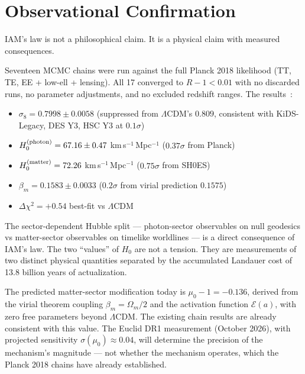 \documentclass[12pt,a4paper]{article}
\begin{document}
\section{Observational Confirmation}
\label{sec:obs}

IAM's law is not a philosophical claim. It is a physical claim with
measured consequences.

Seventeen MCMC chains were run against the full Planck 2018 likelihood
(TT, TE, EE + low-ell + lensing). All 17 converged to $R-1 < 0.01$
with no discarded runs, no parameter adjustments, and no excluded
redshift ranges. The results~\citep{IAM_obs}:

\begin{itemize}
\item $\sigma_8 = 0.7998 \pm 0.0058$ (suppressed from $\Lambda$CDM's
  $0.809$, consistent with KiDS-Legacy, DES Y3, HSC Y3 at $0.1\sigma$)
\item $H_0^{\rm (photon)} = 67.16 \pm 0.47$ km\,s$^{-1}$\,Mpc$^{-1}$
  ($0.37\sigma$ from Planck)
\item $H_0^{\rm (matter)} = 72.26$ km\,s$^{-1}$\,Mpc$^{-1}$
  ($0.75\sigma$ from SH0ES)
\item $\beta_m = 0.1583 \pm 0.0033$ ($0.2\sigma$ from virial prediction
  $0.1575$)
\item $\Delta\chi^2 = +0.54$ best-fit vs $\Lambda$CDM
\end{itemize}

The sector-dependent Hubble split --- photon-sector observables on null
geodesics vs matter-sector observables on timelike worldlines --- is a
direct consequence of IAM's law. The two ``values'' of $H_0$ are not
a tension. They are measurements of two distinct physical quantities
separated by the accumulated Landauer cost of 13.8 billion years of
actualization.

The predicted matter-sector modification today is $\mu_0 - 1 = -0.136$,
derived from the virial theorem coupling $\beta_m = \Omega_m/2$ and the
activation function $\mathcal{E}(a)$, with zero free parameters beyond
$\Lambda$CDM. The existing chain results are already consistent with this
value. The Euclid DR1 measurement (October 2026), with projected
sensitivity $\sigma(\mu_0) \approx 0.04$, will determine the precision
of the mechanism's magnitude --- not whether the mechanism operates, which
the Planck 2018 chains have already established.
\end{document}
